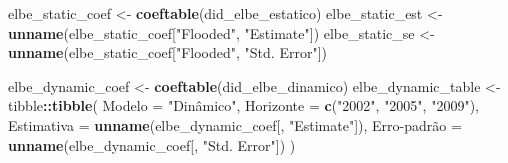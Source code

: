 \documentclass[
]{article}
\newenvironment{Shaded}{\begin{snugshade}}{\end{snugshade}}
\newcommand{\AttributeTok}[1]{\textcolor[rgb]{0.13,0.29,0.53}{#1}}
\newcommand{\FunctionTok}[1]{\textcolor[rgb]{0.13,0.29,0.53}{\textbf{#1}}}
\newcommand{\NormalTok}[1]{#1}
\newcommand{\OtherTok}[1]{\textcolor[rgb]{0.56,0.35,0.01}{#1}}
\newcommand{\SpecialCharTok}[1]{\textcolor[rgb]{0.81,0.36,0.00}{\textbf{#1}}}
\newcommand{\StringTok}[1]{\textcolor[rgb]{0.31,0.60,0.02}{#1}}
\begin{document}
\begin{Shaded}
\begin{Highlighting}[]
\NormalTok{elbe\_static\_coef }\OtherTok{\textless{}{-}} \FunctionTok{coeftable}\NormalTok{(did\_elbe\_estatico)}
\NormalTok{elbe\_static\_est }\OtherTok{\textless{}{-}} \FunctionTok{unname}\NormalTok{(elbe\_static\_coef[}\StringTok{"Flooded"}\NormalTok{, }\StringTok{"Estimate"}\NormalTok{])}
\NormalTok{elbe\_static\_se }\OtherTok{\textless{}{-}} \FunctionTok{unname}\NormalTok{(elbe\_static\_coef[}\StringTok{"Flooded"}\NormalTok{, }\StringTok{"Std. Error"}\NormalTok{])}

\NormalTok{elbe\_dynamic\_coef }\OtherTok{\textless{}{-}} \FunctionTok{coeftable}\NormalTok{(did\_elbe\_dinamico)}
\NormalTok{elbe\_dynamic\_table }\OtherTok{\textless{}{-}}\NormalTok{ tibble}\SpecialCharTok{::}\FunctionTok{tibble}\NormalTok{(}
  \AttributeTok{Modelo =} \StringTok{"Dinâmico"}\NormalTok{,}
  \AttributeTok{Horizonte =} \FunctionTok{c}\NormalTok{(}\StringTok{"2002"}\NormalTok{, }\StringTok{"2005"}\NormalTok{, }\StringTok{"2009"}\NormalTok{),}
  \AttributeTok{Estimativa =} \FunctionTok{unname}\NormalTok{(elbe\_dynamic\_coef[, }\StringTok{"Estimate"}\NormalTok{]),}
  \StringTok{\textasciigrave{}}\AttributeTok{Erro{-}padrão}\StringTok{\textasciigrave{}} \OtherTok{=} \FunctionTok{unname}\NormalTok{(elbe\_dynamic\_coef[, }\StringTok{"Std. Error"}\NormalTok{])}
\NormalTok{)}


\end{Highlighting}
\end{Shaded}
\end{document}

